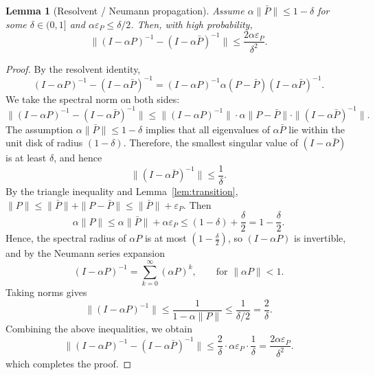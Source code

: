 \documentclass[11pt,english]{article}
\newtheorem{lemma}{Lemma}
\begin{document}
\begin{lemma}[Resolvent / Neumann propagation]
\label{lem:resolvent}
Assume $\alpha\|\bar P\|\le 1-\delta$ for some $\delta\in(0,1]$ and $\alpha\varepsilon_P \le \delta/2$. Then, with high probability,
\[
    \|(I-\alpha P)^{-1} - (I-\alpha \bar P)^{-1}\| \le \frac{2\alpha\varepsilon_P}{\delta^2}.
\]
\end{lemma}

\begin{proof}
By the resolvent identity,
\[
    (I-\alpha P)^{-1} - (I-\alpha \bar P)^{-1} = (I-\alpha P)^{-1}\alpha(P-\bar P)(I-\alpha \bar P)^{-1}.
\]
We take the spectral norm on both sides:
\[
    \|(I-\alpha P)^{-1} - (I-\alpha \bar P)^{-1}\| \le \|(I-\alpha P)^{-1}\| \cdot \alpha\|P-\bar P\| \cdot \|(I-\alpha \bar P)^{-1}\|.
\]
The assumption $\alpha\|\bar P\|\le 1-\delta$ implies that all eigenvalues of $\alpha\bar P$ lie within the unit disk of radius $(1-\delta)$. Therefore, the smallest singular value of $(I - \alpha\bar P)$ is at least $\delta$, and hence
\[
\|(I - \alpha \bar P)^{-1}\| \le \frac{1}{\delta}.
\]
By the triangle inequality and Lemma~\ref{lem:transition}, $\|P\| \le \|\bar P\| + \|P - \bar P\| \le \|\bar P\| + \varepsilon_P$.
Then
\[
\alpha\|P\| \le \alpha\|\bar P\| + \alpha\varepsilon_P 
\le (1 - \delta) + \frac{\delta}{2} = 1 - \frac{\delta}{2}.
\]
Hence, the spectral radius of $\alpha P$ is at most $(1 - \frac{\delta}{2})$, 
so $(I - \alpha P)$ is invertible, and by the Neumann series expansion
\[
(I - \alpha P)^{-1} = \sum_{k=0}^{\infty} (\alpha P)^k, \qquad \text{for } \|\alpha P\|<1.
\]
Taking norms gives
\[
\|(I - \alpha P)^{-1}\| \le \frac{1}{1 - \alpha\|P\|} 
\le \frac{1}{\delta/2} = \frac{2}{\delta}.
\]
Combining the above inequalities, we obtain
\[
    \|(I - \alpha P)^{-1} - (I - \alpha \bar P)^{-1}\| \le \frac{2}{\delta} \cdot \alpha\varepsilon_P \cdot \frac{1}{\delta} = \frac{2\alpha\varepsilon_P}{\delta^2}.
\]
which completes the proof. 
\end{proof}

\end{document}
